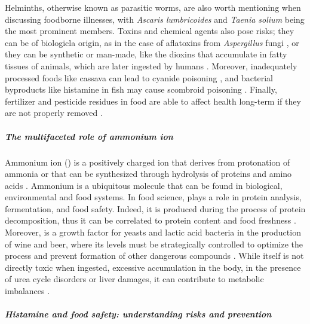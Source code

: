 Helminths, otherwise known as parasitic worms, are also worth mentioning when discussing foodborne illnesses, with \textit{Ascaris lumbricoides} \citep{leungHuman2021} and \textit{Taenia solium} \citep{ngwiliQualitative2021} being the most prominent members. Toxins and chemical agents also pose risks; they can be of biologicla origin, as in the case of aflatoxins from \textit{Aspergillus} fungi \citep{chaincontamRisk2020}, or they can be synthetic or man-made, like the dioxins that accumulate in fatty tissues of animals, which are later ingested by humans \citep{chaincontamRisk2018}. Moreover, inadequately processed foods like cassava can lead to cyanide poisoning \citep{okaforOccupational2002}, and bacterial byproducts like histamine in fish may cause scombroid poisoning \citep{landeteUpdated2008}. Finally, fertilizer and pesticide residues in food are able to affect health long-term if they are not properly removed \citep{kimExposure2017}.

\subparagraph{The multifaceted role of ammonium ion}
Ammonium ion (\amm{}) is a positively charged ion that derives from protonation of ammonia or that can be synthesized through hydrolysis of proteins and amino acids \citep{barracloughDirect1997}. Ammonium is a ubiquitous molecule that can be found in biological, environmental and food systems.
In food science, \amm{} plays a role in protein analysis, fermentation, and food safety. Indeed, it is produced during the process of protein decomposition, thus it can be correlated to protein content and food freshness \citep{wuEvaluation2022}. Moreover,  is a growth factor for yeasts and lactic acid bacteria in the production of wine and beer, where its levels must be strategically controlled to optimize the process and prevent formation of other dangerous compounds \citep{gomez-alonsoSimultaneous2007}. While \amm{}  itself is not directly toxic when ingested, excessive accumulation in the body, \eg{} in the presence of urea cycle disorders or liver damages, it can contribute to metabolic imbalances \cite{adevaAmmonium2012}.

\subparagraph{Histamine and food safety: understanding risks and prevention}

